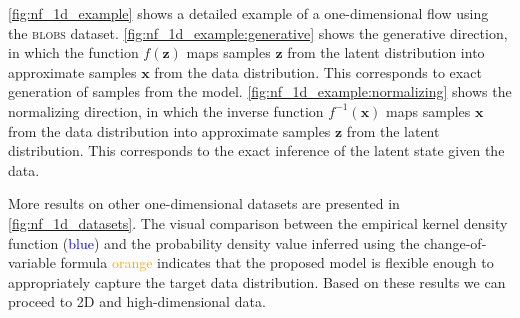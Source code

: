 \clearpage

\cref{fig:nf_1d_example} shows a detailed example of a one-dimensional flow using the \textsc{blobs} dataset. 
\cref{fig:nf_1d_example:generative} shows the generative direction, in which the function $f(\mathbf{z})$ maps samples $\mathbf{z}$ from the latent distribution into approximate samples $\mathbf{x}$ from the data distribution. This corresponds to exact generation of samples from the model.
\cref{fig:nf_1d_example:normalizing} shows the normalizing direction, in which the inverse function $f^{-1}(\mathbf{x})$ maps samples $\mathbf{x}$ from the data distribution into approximate samples $\mathbf{z}$ from the latent distribution. This corresponds to the exact inference of the latent state given the data. 

More results on other one-dimensional datasets are presented in \cref{fig:nf_1d_datasets}. The visual comparison between the empirical kernel density function (\textcolor{blue}{blue}) and the  probability density value inferred using the change-of-variable formula \textcolor{orange}{orange} indicates that the proposed model is flexible enough to appropriately capture the target data distribution. Based on these results we can proceed to 2D and high-dimensional data.

